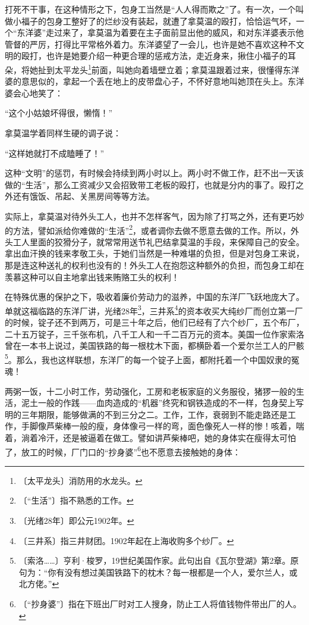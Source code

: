 \documentclass[12pt,UTF-8,openany]{ctexbook}
\begin{document}
\begin{normalsize}
    打死不干事，在这种情形之下，包身工当然是“人人得而欺之”了。有一次，一个叫做小福子的包身工整好了的烂纱没有装起，就遭了拿莫温的殴打，恰恰运气坏，一个“东洋婆”走过来了，拿莫温为着要在主子面前显出他的威风，和对东洋婆表示他管督的严厉，打得比平常格外着力。东洋婆望了一会儿，也许是她不喜欢这种不文明的殴打，也许是她要介绍一种更合理的惩戒方法，走近身来，揪住小福子的耳朵，将她扯到太平龙头\footnote{〔太平龙头〕消防用的水龙头。}前面，叫她向着墙壁立着；拿莫温跟着过来，很懂得东洋婆的意思似的，拿起一个丢在地上的皮带盘心子，不怀好意地叫她顶在头上。东洋婆会心地笑了：
    
    “这个小姑娘坏得很，懒惰！”
    
    拿莫温学着同样生硬的调子说：
    
    “这样她就打不成瞌睡了！”
    
    这种“文明”的惩罚，有时候会持续到两小时以上。两小时不做工作，赶不出一天该做的“生活”，那么工资减少又会招致带工老板的殴打，也就是分内的事了。殴打之外还有饿饭、吊起、关黑房间等等方法。
    
    实际上，拿莫温对待外头工人，也并不怎样客气，因为除了打骂之外，还有更巧妙的方法，譬如派给你难做的“生活”\footnote{〔“生活”〕指不熟悉的工作。}，或者调你去做不愿意去做的工作。所以，外头工人里面的狡猾分子，就常常用送节礼巴结拿莫温的手段，来保障自己的安全。拿出血汗换的钱来孝敬工头，于她们当然是一种难堪的负担，但是对包身工来说，那是连这种送礼的权利也没有的！外头工人在抱怨这种额外的负担，而包身工却在羡慕这种可以自主地拿出钱来贿赂工头的权利！
    
    在特殊优惠的保护之下，吸收着廉价劳动力的滋养，中国的东洋厂飞跃地庞大了。单就这福临路的东洋厂讲，光绪28年\footnote{〔光绪28年〕即公元1902年。}，三井系\footnote{〔三井系〕指三井财团。1902年起在上海收购多个纱厂。}的资本收买大纯纱厂而创立第一厂的时候，锭子还不到两万，可是三十年之后，他们已经有了六个纱厂，五个布厂，二十五万锭子，三千张布机，八千工人和一千二百万元的资本。美国一位作家索洛曾在一本书上说过，美国铁路的每一根枕木下面，都横卧着一个爱尔兰工人的尸骸\footnote{〔索洛……〕亨利·梭罗，19世纪美国作家。此句出自《瓦尔登湖》第2章。原句为：“你有没有想过美国铁路下的枕木？每一根都是一个人，爱尔兰人，或北方佬。”}。那么，我也这样联想，东洋厂的每一个锭子上面，都附托着一个中国奴隶的冤魂！
    
    两粥一饭，十二小时工作，劳动强化，工房和老板家庭的义务服役，猪猡一般的生活，泥土一般的作践——血肉造成的“机器”终究和钢铁造成的不一样，包身契上写明的三年期限，能够做满的不到三分之二。工作，工作，衰弱到不能走路还是工作，手脚像芦柴棒一般的瘦，身体像弓一样的弯，面色像死人一样的惨！咳着，喘着，淌着冷汗，还是被逼着在做工。譬如讲芦柴棒吧，她的身体实在瘦得太可怕了，放工的时候，厂门口的“抄身婆”\footnote{〔“抄身婆”〕指在下班出厂时对工人搜身，防止工人将值钱物件带出厂的人。}也不愿意去接触她的身体：
    

\end{normalsize}
\end{document}
